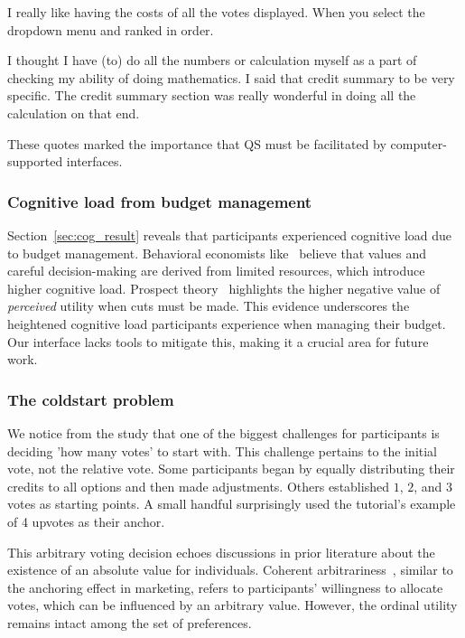 \begin{displayquote}
I really like having the costs of all the votes displayed. When you select the dropdown menu and ranked in order. \hfill{}
\end{displayquote}

\begin{displayquote}
I thought I have \bracketellipsis (to) do all the numbers or calculation myself as a part of checking my ability of doing mathematics. \bracketellipsis I said that credit summary to be very specific. The credit summary section was really wonderful in doing all the calculation on that end. \hfill{}
\end{displayquote}

These quotes marked the importance that QS must be facilitated by computer-supported interfaces.

\subsubsection{Cognitive load from budget management}
Section~\ref{sec:cog_result} reveals that participants experienced cognitive load due to budget management. Behavioral economists like~\textcite{Shah2015a} believe that values and careful decision-making are derived from limited resources, which introduce higher cognitive load. Prospect theory~\cite{kahnemanProspectTheoryAnalysis1979} highlights the higher negative value of \textit{perceived} utility when cuts must be made. This evidence underscores the heightened cognitive load participants experience when managing their budget. Our interface lacks tools to mitigate this, making it a crucial area for future work.

\subsubsection{The coldstart problem}
We notice from the study that one of the biggest challenges for participants is deciding 'how many votes' to start with. This challenge pertains to the initial vote, not the relative vote. Some participants began by equally distributing their credits to all options and then made adjustments. Others established $1$, $2$, and $3$ votes as starting points. A small handful surprisingly used the tutorial's example of 4 upvotes as their anchor.

This arbitrary voting decision echoes discussions in prior literature about the existence of an absolute value for individuals. Coherent arbitrariness~\cite{arielyCoherentArbitrarinessStable2003}, similar to the anchoring effect in marketing, refers to participants' willingness to allocate votes, which can be influenced by an arbitrary value. However, the ordinal utility remains intact among the set of preferences.

